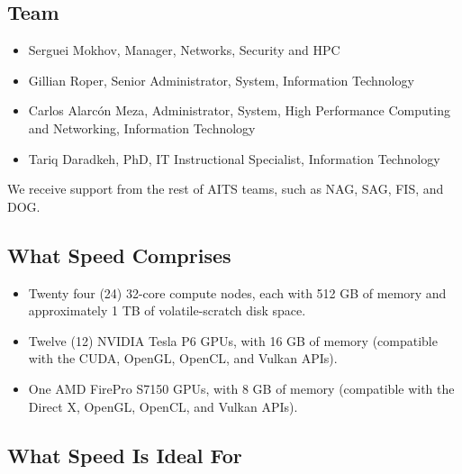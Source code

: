 \documentclass{easychair}
\begin{document}
\subsection{Team}

\begin{itemize}
	\item 
Serguei Mokhov, Manager, Networks, Security and HPC
	\item 
Gillian Roper, Senior Administrator, System, Information Technology
	\item 
Carlos Alarcón Meza, Administrator, System, High Performance Computing and Networking, Information Technology
	\item 
Tariq Daradkeh, PhD, IT Instructional Specialist, Information Technology
\end{itemize}

We receive support from the rest of AITS teams, such
as NAG, SAG, FIS, and DOG.

\subsection{What Speed Comprises}

\begin{itemize}
\item
Twenty four (24) 32-core compute nodes, each with 512 GB of memory and approximately 1 TB of volatile-scratch disk space. 
\item
Twelve (12) NVIDIA Tesla P6 GPUs, with 16 GB of memory (compatible with the CUDA, OpenGL, OpenCL, and Vulkan APIs). 
\item
One AMD FirePro S7150 GPUs, with 8 GB of memory (compatible with the Direct X, OpenGL, OpenCL, and Vulkan APIs). 
\end{itemize}

\subsection{What Speed Is Ideal For}
\label{sect:speed-is-for}
\end{document}
